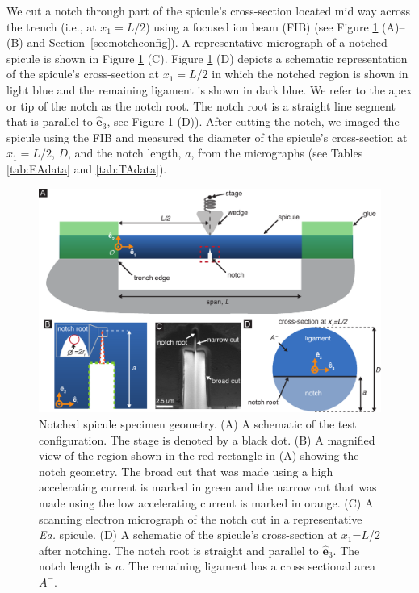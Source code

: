 \documentclass[12pt,onecolumn]{article}
\makeatletter
\newcommand{\ez}{{\bm{\hat{e}}}_3}
\newcommand{\EA}{\textit{Ea.\@}\xspace}
\makeatother
\begin{document}
\begin{bibunit}
We cut a notch through part of the spicule's cross-section located mid way across the trench (i.e., at $x_1=L/2$) using a focused ion beam (FIB) (see Figure \ref{fig:notch} (A)--(B) and Section~\ref{sec:notchconfig}). A representative micrograph of a notched spicule is shown in Figure \ref{fig:notch} (C). Figure \ref{fig:notch} (D) depicts a schematic representation of the spicule's cross-section at $x_1=L/2$ in which the notched region is shown in light blue and the remaining ligament is shown in dark blue. We refer to the apex or tip of the notch as the notch root. The notch root is a straight line segment that is parallel to $\ez$, see Figure \ref{fig:notch} (D)). After cutting the notch, we imaged the spicule using the FIB and measured the diameter of the spicule's cross-section at $x_1=L/2$, $D$, and the notch length, $a$, from the micrographs (see Tables \ref{tab:EAdata} and \ref{tab:TAdata}). 
%
			\begin{figure}[hb!]
			\centering
			\includegraphics[width=\textwidth]{../Figures/FigureNotch/Figure3_V6.pdf}
			\caption{Notched spicule specimen geometry. (A) A schematic of the test configuration. The stage is denoted by a black dot. (B) A magnified view of the region shown in the red rectangle in (A) showing the notch geometry. The broad cut that was made using a high accelerating current is marked in green and the narrow cut that was made using the low accelerating current is marked in orange. (C) A scanning electron micrograph of the notch cut in a representative \EA spicule. (D) A schematic of the spicule's cross-section at $x_1$=$L$/2 after notching. The notch root is straight and parallel to $\ez$. The notch length is $a$. The remaining ligament has a cross sectional area $A^-$.}
			\label{fig:notch}
			\end{figure}


\end{bibunit}
\end{document}
